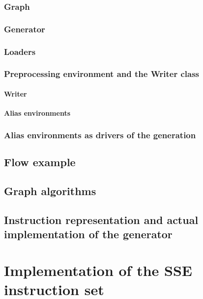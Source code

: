         \subsection{Graph}

        \subsection{Generator}

        \subsection{Loaders}

        \subsection{Preprocessing environment and the Writer class}

            \subsubsection{Writer}

            \subsubsection{Alias environments}

        \subsection{Alias environments as drivers of the generation}

    \section{Flow example}

    \section{Graph algorithms}

    \section{Instruction representation and actual implementation of the generator}


\chapter{Implementation of the SSE instruction set}

